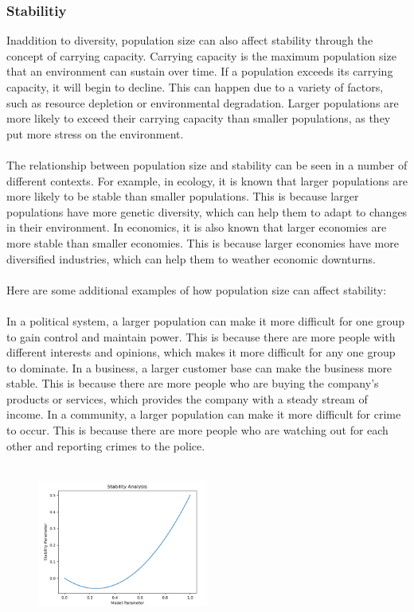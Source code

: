 \documentclass[12pt]{article}
\begin{document}
\subsubsection{Stabilitiy}
Inaddition to diversity, population size can also affect stability through the concept of carrying capacity. Carrying capacity is the maximum population size that an environment can sustain over time. If a population exceeds its carrying capacity, it will begin to decline. This can happen due to a variety of factors, such as resource depletion or environmental degradation. Larger populations are more likely to exceed their carrying capacity than smaller populations, as they put more stress on the environment.\\\\
The relationship between population size and stability can be seen in a number of different contexts. For example, in ecology, it is known that larger populations are more likely to be stable than smaller populations. This is because larger populations have more genetic diversity, which can help them to adapt to changes in their environment. In economics, it is also known that larger economies are more stable than smaller economies. This is because larger economies have more diversified industries, which can help them to weather economic downturns.\\\\
Here are some additional examples of how population size can affect stability:\\\\
In a political system, a larger population can make it more difficult for one group to gain control and maintain power. This is because there are more people with different interests and opinions, which makes it more difficult for any one group to dominate.
In a business, a larger customer base can make the business more stable. This is because there are more people who are buying the company's products or services, which provides the company with a steady stream of income. In a community, a larger population can make it more difficult for crime to occur. This is because there are more people who are watching out for each other and reporting crimes to the police.\\\\
\begin{figure}[H]
  \centering
  \includegraphics[width=0.5\textwidth]{stabilityfinal.png}
\end{figure}
\end{document}
